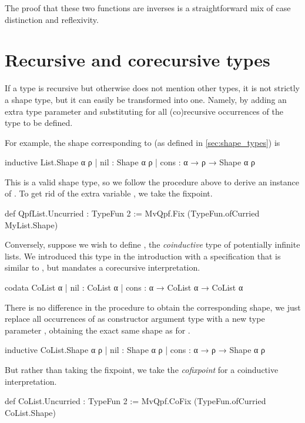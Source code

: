 The proof that these two functions are inverses is a straightforward mix of case distinction and reflexivity.






\section{Recursive and corecursive types}%
\label{sec:rec_types}
If a type is recursive but otherwise does not mention other types, it is not strictly a shape type,
but it can easily be transformed into one.
Namely, by adding an extra type parameter  and substituting  for all (co)recursive occurrences of the type
to be defined.

For example, the shape corresponding to  (as defined in \cref{sec:shape_types}) is
\begin{leancode}
  inductive List.Shape α ρ
    | nil  : Shape α ρ
    | cons : α → ρ → Shape α ρ
\end{leancode}
This is a valid shape type, so we follow the procedure above to derive an instance of .
To get rid of the extra variable , we take the fixpoint.
\begin{leancode}
  def QpfList.Uncurried : TypeFun 2 
    := MvQpf.Fix (TypeFun.ofCurried MyList.Shape)
\end{leancode}

Conversely, suppose we wish to define , the \emph{coinductive} type of potentially infinite lists.
We introduced this type in the introduction with a specification that is similar to , but mandates a corecursive interpretation.
\begin{leancode}
  codata CoList α
    | nil  : CoList α
    | cons : α → CoList α → CoList α
\end{leancode}
There is no difference in the procedure to obtain the corresponding shape, we just replace all occurrences
of  as constructor argument type with a new type parameter , obtaining the exact same shape
as for .
\begin{leancode}
  inductive CoList.Shape α ρ
    | nil  : Shape α ρ
    | cons : α → ρ → Shape α ρ
\end{leancode}
But rather than taking the fixpoint, we take the \emph{cofixpoint} for a coinductive interpretation.
\begin{leancode}
  def CoList.Uncurried : TypeFun 2 
    := MvQpf.CoFix (TypeFun.ofCurried CoList.Shape)
\end{leancode}





